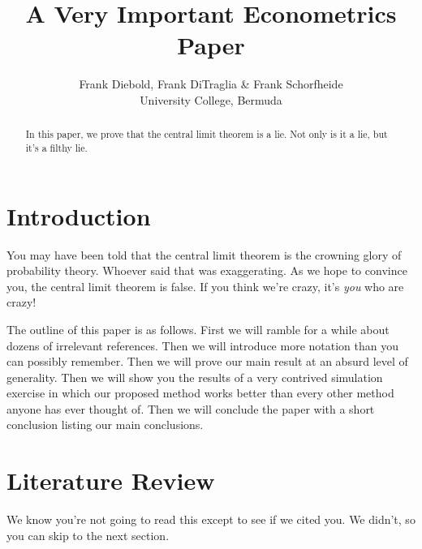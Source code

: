 \documentclass[12pt,letterpaper]{article}
\title{A Very Important Econometrics Paper}
\author{Frank Diebold, Frank DiTraglia \& Frank Schorfheide \\ University College, Bermuda}
\begin{document}
\maketitle
\begin{abstract}
	In this paper, we prove that the central limit theorem is a lie. 
	Not only is it a lie, but it's a filthy lie.
\end{abstract}

\section{Introduction}
You may have been told that the central limit theorem is the crowning glory of probability theory.
Whoever said that was exaggerating.
As we hope to convince you, the central limit theorem is false.
If you think we're crazy, it's \emph{you} who are crazy!

The outline of this paper is as follows.
First we will ramble for a while about dozens of irrelevant references.
Then we will introduce more notation than you can possibly remember.
Then we will prove our main result at an absurd level of generality.
Then we will show you the results of a very contrived simulation exercise in which our proposed method works better than every other method anyone has ever thought of.
Then we will conclude the paper with a short conclusion listing our main conclusions.

\section{Literature Review}
We know you're not going to read this except to see if we cited you.
We didn't, so you can skip to the next section.
\end{document}
